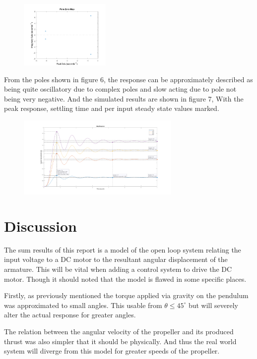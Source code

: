 \documentclass[a4paper,11pt]{article}
\begin{document}
\begin{figure}[h]
        \centering
        \includegraphics[width=0.39\textwidth]{inc/poles_sys.png}
        \caption{}
        \label{}
\end{figure}

From the poles shown in figure 6, the response can be approximately described as being quite oscillatory due to complex poles and slow acting due to pole not being very negative. And the simulated results are shown in figure 7, With the peak response, settling time and per input steady state values marked.

\begin{figure}[h]
        \centering
        \includegraphics[width=0.7\textwidth]{inc/combined_sys.png}
        \caption{}
        \label{}
\end{figure}

\newpage
\section{Discussion}
The sum results of this report is a model of the open loop system relating the input voltage to a DC motor to the resultant angular displacement of the armature. This will be vital when adding a control system to drive the DC motor. Though it should noted that the model is flawed in some specific places.

Firstly, as previously mentioned the torque applied via gravity on the pendulum was approximated to small angles. This usable from $\theta \le 45^{\circ}$ but will severely alter the actual response for greater angles.

The relation between the angular velocity of the propeller and its produced thrust was also simpler that it should be physically. And thus the real world system will diverge from this model for greater speeds of the propeller.
\end{document}
